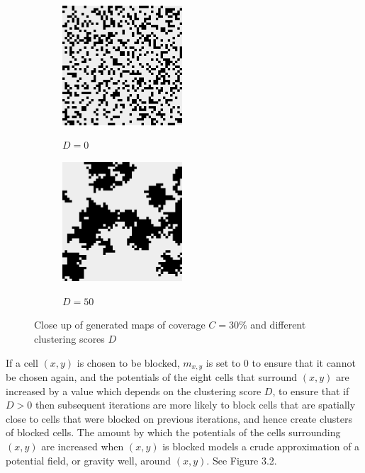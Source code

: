 \documentclass[12pt,notitlepage]{report}
\begin{document}
\begin{figure}
\centering
  \begin{subfigure}{.49\textwidth}
  \centering
  {\includegraphics[width=0.49\textwidth]{clustering0_.png}}
  \caption{$D=0$}
  \end{subfigure}
  \begin{subfigure}{.49\textwidth}
  \centering
  {\includegraphics[width=0.49\textwidth]{clustering50_.png}}
  \caption{$D=50$}
  \end{subfigure}
  \caption[Close up of generated maps]{Close up of generated maps of coverage $C=30\%$ and different clustering scores $D$} 
\end{figure}

\noindent
If a cell $(x,y)$ is chosen to be blocked, $m_{x,y}$ is set to $0$ to ensure that it cannot be chosen again, and the potentials of the eight cells that surround $(x,y)$ are increased by a value which depends on the clustering score $D$, to ensure that if $D > 0$ then subsequent iterations are more likely to block cells that are spatially close to cells that were blocked on previous iterations, and hence create clusters of blocked cells. The amount by which the potentials of the cells surrounding $(x,y)$ are increased when $(x,y)$ is blocked models a crude approximation of a potential field, or gravity well, around $(x,y)$. See Figure 3.2.\\
\end{document}
